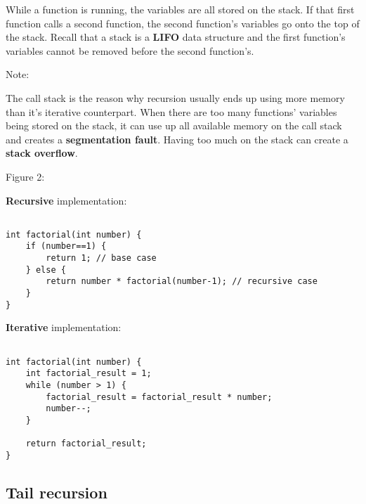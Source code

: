 \documentclass[11pt,a4paper,english]{paper}
\begin{document}
\bigskip
\noindent
While a function is running, the variables are all stored on the stack. If that first function calls a second function, the second function's variables go onto the top of the stack. Recall that a stack is a \textbf{LIFO} data structure and the first function's variables cannot be removed before the second function's.

\bigskip

\begin{mybox}{Note:} {

    The call stack is the reason why recursion usually ends up using more memory than it's iterative counterpart. When there are too many functions' variables being stored on the stack, it can use up all available memory on the call stack and creates a \textbf{segmentation fault}. Having too much on the stack can create a \textbf{stack overflow}.

  }
\end{mybox}

\bigskip

\begin{bbox}{Figure 2:} {

    \textbf{Recursive} implementation:

\begin{verbatim}

int factorial(int number) {
    if (number==1) {
        return 1; // base case
    } else {
        return number * factorial(number-1); // recursive case
    }
}

\end{verbatim}

\bigskip

\textbf{Iterative} implementation:

\begin{verbatim}

int factorial(int number) {
    int factorial_result = 1;
    while (number > 1) {
        factorial_result = factorial_result * number;
        number--;
    }

    return factorial_result;
}

\end{verbatim}



}\end{bbox}

\subsection{Tail recursion}
\end{document}

